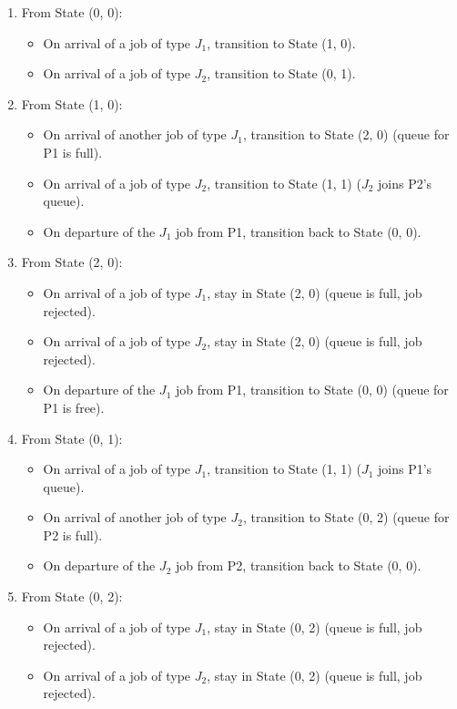 \documentclass{article}
\begin{document}
\begin{enumerate}
  \item From State (0, 0):
  \begin{itemize}
    \item On arrival of a job of type $J_1$, transition to State (1, 0).
    \item On arrival of a job of type $J_2$, transition to State (0, 1).
  \end{itemize}
  \item From State (1, 0):
  \begin{itemize}
    \item On arrival of another job of type $J_1$, transition to State (2, 0) (queue for P1 is full).
    \item On arrival of a job of type $J_2$, transition to State (1, 1) ($J_2$ joins P2's queue).
    \item On departure of the $J_1$ job from P1, transition back to State (0, 0).
  \end{itemize}
  \item From State (2, 0):
  \begin{itemize}
    \item On arrival of a job of type $J_1$, stay in State (2, 0) (queue is full, job rejected).
    \item On arrival of a job of type $J_2$, stay in State (2, 0) (queue is full, job rejected).
    \item On departure of the $J_1$ job from P1, transition to State (0, 0) (queue for P1 is free).
  \end{itemize}
  \item From State (0, 1):
  \begin{itemize}
    \item On arrival of a job of type $J_1$, transition to State (1, 1) ($J_1$ joins P1's queue).
    \item On arrival of another job of type $J_2$, transition to State (0, 2) (queue for P2 is full).
    \item On departure of the $J_2$ job from P2, transition back to State (0, 0).
  \end{itemize}
  \item From State (0, 2):
  \begin{itemize}
    \item On arrival of a job of type $J_1$, stay in State (0, 2) (queue is full, job rejected).
    \item On arrival of a job of type $J_2$, stay in State (0, 2) (queue is full, job rejected).

\end{itemize}
\end{enumerate}
\end{document}
